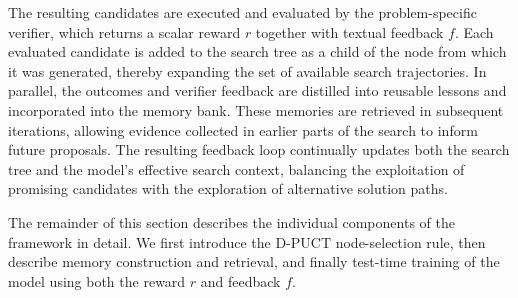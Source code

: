 \documentclass{article} %
\begin{document}
The resulting candidates are executed and evaluated by the problem-specific verifier, which returns a scalar reward $r$ together with textual feedback $f$. Each evaluated candidate is added to the search tree as a child of the node from which it was generated, thereby expanding the set of available search trajectories. In parallel, the outcomes and verifier feedback are distilled into reusable lessons and incorporated into the memory bank. These memories are retrieved in subsequent iterations, allowing evidence collected in earlier parts of the search to inform future proposals. The resulting feedback loop continually updates both the search tree and the model's effective search context, balancing the exploitation of promising candidates with the exploration of alternative solution paths.

The remainder of this section describes the individual components of the framework in detail. We first introduce the D-PUCT node-selection rule, then describe memory construction and retrieval, and finally test-time training of the model using  both the reward $r$ and feedback $f$.
\end{document}

